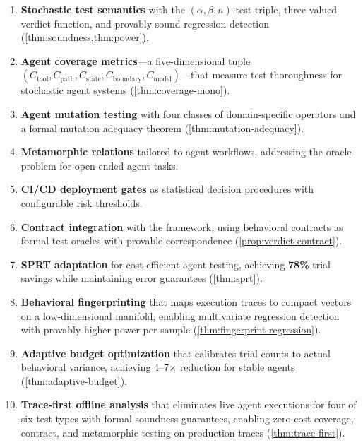 \begin{enumerate}[leftmargin=*]
  \item \textbf{Stochastic test semantics} with the $(\alpha, \beta, n)$-test
    triple, three-valued verdict function, and provably sound regression
    detection (\cref{thm:soundness,thm:power}).

  \item \textbf{Agent coverage metrics}---a five-dimensional tuple
    $(C_{\text{tool}}, C_{\text{path}}, C_{\text{state}},
    C_{\text{boundary}}, C_{\text{model}})$---that measure test
    thoroughness for stochastic agent systems (\cref{thm:coverage-mono}).

  \item \textbf{Agent mutation testing} with four classes of
    domain-specific operators and a formal mutation adequacy theorem
    (\cref{thm:mutation-adequacy}).

  \item \textbf{Metamorphic relations} tailored to agent workflows,
    addressing the oracle problem for open-ended agent tasks.

  \item \textbf{CI/CD deployment gates} as statistical decision
    procedures with configurable risk thresholds.

  \item \textbf{Contract integration} with the \agentassert{} framework,
    using behavioral contracts as formal test oracles with provable
    correspondence (\cref{prop:verdict-contract}).

  \item \textbf{SPRT adaptation} for cost-efficient agent testing,
    achieving \textbf{78\%} trial savings while maintaining error
    guarantees (\cref{thm:sprt}).

  \item \textbf{Behavioral fingerprinting} that maps execution
    traces to compact vectors on a low-dimensional manifold,
    enabling multivariate regression detection with provably
    higher power per sample (\cref{thm:fingerprint-regression}).

  \item \textbf{Adaptive budget optimization} that calibrates trial
    counts to actual behavioral variance, achieving 4--7$\times$
    reduction for stable agents (\cref{thm:adaptive-budget}).

  \item \textbf{Trace-first offline analysis} that eliminates live
    agent executions for four of six test types with formal soundness
    guarantees, enabling zero-cost coverage, contract, and metamorphic
    testing on production traces (\cref{thm:trace-first}).
\end{enumerate}

